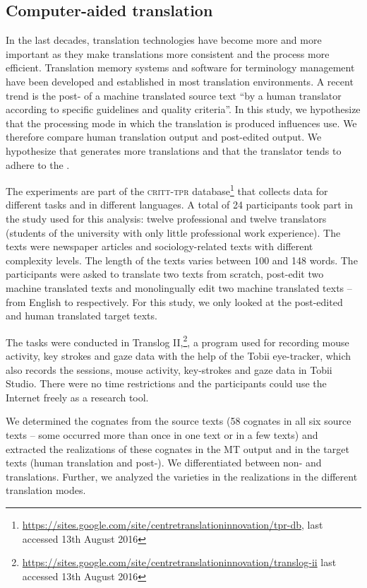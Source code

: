 \documentclass[output=paper]{LSP/langsci}
\begin{document}
\subsection{Computer-aided translation}\label{hansenschirraetal:sec:4.2}
In the last decades, translation technologies have become more and more important as they make translations more consistent and the process more efficient. Translation memory systems and software for terminology management have been developed and established in most translation environments. A recent trend is the post- of a machine translated source text ``by a human translator according to specific guidelines and quality criteria''. \citep[197]{OBrien2011} In this study, we hypothesize that the processing mode in which the translation is produced influences  use. We therefore compare human translation output and post-edited output. We hypothesize that  generates more  translations and that the translator tends to adhere to the .

The experiments are part of the \textsc{critt-tpr} database\footnote{\url{https://sites.google.com/site/centretranslationinnovation/tpr-db}, last accessed 13th August 2016} that collects  data for different tasks and in different languages. A total of 24 participants took part in the study used for this analysis: twelve professional and twelve  translators (students of the university with only little professional work experience). The texts were newspaper articles and sociology-related texts with different complexity levels. The length of the texts varies between 100 and 148 words. The participants were asked to translate two texts from scratch, post-edit two machine translated texts and monolingually edit two machine translated texts – from English to  respectively. For this study, we only looked at the post-edited and human translated target texts.

The tasks were conducted in Translog II,\footnote{\url{https://sites.google.com/site/centretranslationinnovation/translog-ii} last accessed 13th August 2016}, a program used for recording mouse activity, key strokes and gaze data with the help of the Tobii eye-tracker, which also records the sessions, mouse activity, key-strokes and gaze data in Tobii Studio. There were no time restrictions and the participants could use the Internet freely as a research tool.

We determined the cognates from the source texts (58 cognates in all six source texts – some occurred more than once in one text or in a few texts) and extracted the realizations of these cognates in the MT output and in the target texts (human translation and post-). We differentiated between non- and  translations. Further, we analyzed the varieties in the  realizations in the different translation modes.
\end{document}
